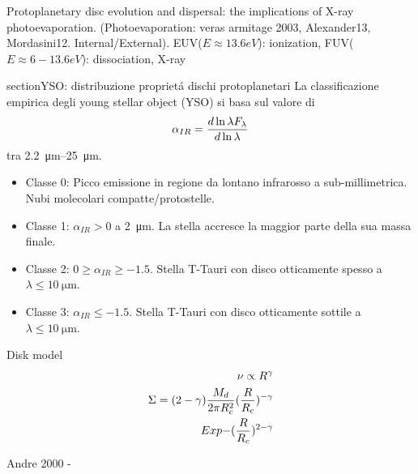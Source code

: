 \begin{workout}
	Protoplanetary disc evolution and dispersal: the implications of X-ray photoevaporation.
	(Photoevaporation: veras armitage 2003, Alexander13, Mordasini12. Internal/External).
	EUV($E\approx13.6eV$): ionization, FUV($E\approx6-13.6eV$): dissociation, X-ray
\end{workout}

\begin{workout}
	section{YSO: distribuzione propriet\'a dischi protoplanetari}
	La classificazione empirica degli young stellar object (YSO) si basa sul valore di
	\begin{equation}
	\alpha_{IR}=\frac{d \ln{\lambda F_{\lambda}}}{d \ln{\lambda}}
	\end{equation}
	tra \SIrange{2.2}{25}{\micro\meter}.
	\begin{itemize}
		\item Classe 0: Picco emissione in regione da lontano infrarosso a sub-millimetrica. Nubi molecolari compatte/protostelle.
		\item Classe 1: $\alpha_{IR}>0$ a \SI{2}{\micro\meter}. La stella accresce la maggior parte della sua massa finale.
		\item Classe 2: $0\geq\alpha_{IR}\geq-1.5$. Stella T-Tauri con disco otticamente spesso a $\lambda\leq\SI{10}{\micro\meter}$.
		\item Classe 3: $\alpha_{IR}\leq-1.5$. Stella T-Tauri con disco otticamente sottile a $\lambda\leq\SI{10}{\micro\meter}$.
	\end{itemize}
\end{workout}

\begin{workout}
	Disk model
	\begin{align}
		\nu\propto R^{\gamma}\\
		\Sigma=(2-\gamma)\frac{M_d}{2\pi R_c^2}(\frac{R}{R_c})^{-\gamma}\\Exp{-(\frac{R}{R_c})^{2-\gamma}}
	\end{align}
\end{workout}


\begin{workout}
	Andre 2000 - 
\end{workout}


